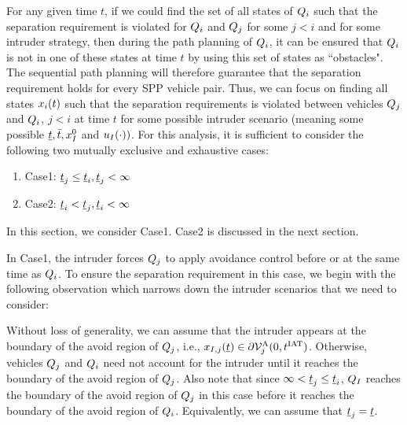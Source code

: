 For any given time $t$, if we could find the set of all states of $Q_i$ such that the separation requirement is violated for $Q_i$ and $Q_j$ for some $j<i$ and for some intruder strategy, then during the path planning of $Q_i$, it can be ensured that $Q_i$ is not in one of these states at time $t$ by using this set of states as ``obstacles". The sequential path planning will therefore guarantee that the separation requirement holds for every SPP vehicle pair. Thus, we can focus on finding all states $x_i(t)$ such that the separation requirements is violated between vehicles $Q_j$ and $Q_i$, $j <i$ at time $t$ for some possible intruder scenario (meaning some possible $\underline{t}, \bar{t}, x_{I}^0$ and $u_{I}(\cdot))$. For this analysis, it is sufficient to consider the following two mutually exclusive and exhaustive cases: 
\begin{enumerate}
\item Case1: $\underline{t}_j \leq \underline{t}_i, \underline{t}_j < \infty$
\item Case2: $\underline{t}_i < \underline{t}_j, \underline{t}_i <\infty$
\end{enumerate}
In this section, we consider Case1. Case2 is discussed in the next section.  

In Case1, the intruder forces $Q_j$ to apply avoidance control before or at the same time as $Q_i$. %
To ensure the separation requirement in this case, we begin with the following observation which narrows down the intruder scenarios that we need to consider:
\begin{observation} \label{obs1_case1}
Without loss of generality, we can assume that the intruder appears at the boundary of the avoid region of $Q_j$, i.e., $x_{I, j}(\underline{t}) \in \partial \mathcal{V}^{\text{A}}_{j}(0, t^\text{IAT})$. Otherwise, vehicles $Q_j$ and $Q_i$ need not account for the intruder until it reaches the boundary of the avoid region of $Q_j$. Also note that since $\infty < \underline{t}_j \leq \underline{t}_i$, $Q_{I}$ reaches the boundary of the avoid region of $Q_j$ in this case before it reaches the boundary of the avoid region of $Q_i$. Equivalently, we can assume that $\underline{t}_j = \underline{t}$.
\end{observation}